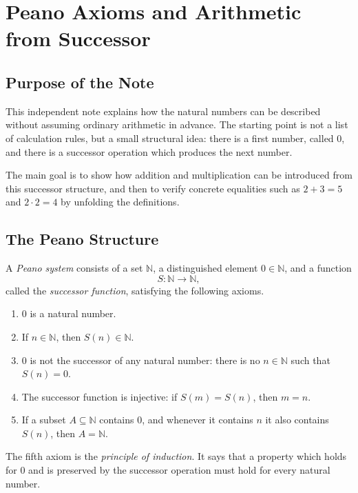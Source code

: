 \chapter{Peano Axioms and Arithmetic from Successor}

\section{Purpose of the Note}

This independent note explains how the natural numbers can be described without
assuming ordinary arithmetic in advance. The starting point is not a list of
calculation rules, but a small structural idea: there is a first number, called
\(0\), and there is a successor operation which produces the next number.

The main goal is to show how addition and multiplication can be introduced from
this successor structure, and then to verify concrete equalities such as
\(2+3=5\) and \(2\cdot 2=4\) by unfolding the definitions.

\section{The Peano Structure}

\begin{definitionbox}
A \emph{Peano system} consists of a set \(\mathbb{N}\), a distinguished element
\(0\in \mathbb{N}\), and a function
\[
S:\mathbb{N}\to\mathbb{N},
\]
called the \emph{successor function}, satisfying the following axioms.

\begin{enumerate}
    \item \(0\) is a natural number.
    \item If \(n\in\mathbb{N}\), then \(S(n)\in\mathbb{N}\).
    \item \(0\) is not the successor of any natural number: there is no
    \(n\in\mathbb{N}\) such that \(S(n)=0\).
    \item The successor function is injective: if \(S(m)=S(n)\), then
    \(m=n\).
    \item If a subset \(A\subseteq \mathbb{N}\) contains \(0\), and whenever it
    contains \(n\) it also contains \(S(n)\), then \(A=\mathbb{N}\).
\end{enumerate}
\end{definitionbox}

The fifth axiom is the \emph{principle of induction}. It says that a property
which holds for \(0\) and is preserved by the successor operation must hold for
every natural number.

